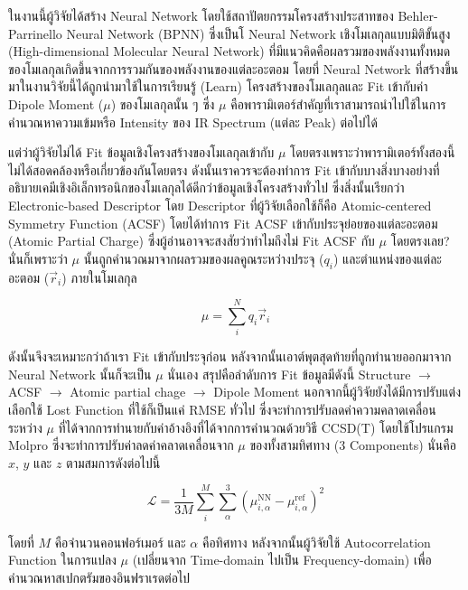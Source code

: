ในงานนี้ผู้วิจัยได้สร้าง Neural Network โดยใช้สถาปัตยกรรมโครงสร้างประสาทของ Behler-Parrinello Neural Network (BPNN)
\autocite{behler2007,behler2011b,behler2015} ซึ่งเป็นโ Neural Network เชิงโมเลกุลแบบมิติขั้นสูง (High-dimensional Molecular 
Neural Network) ที่มีแนวคิดคือผลรวมของพลังงานทั้งหมดของโมเลกุลเกิดขึ้นจากการรวมกันของพลังงานของแต่ละอะตอม โดยที่ Neural Network 
ที่สร้างขึ้นมาในงานวิจัยนี้ได้ถูกนำมาใช้ในการเรียนรู้ (Learn) โครงสร้างของโมเลกุลและ Fit เข้ากับค่า Dipole Moment ($\mu$) ของโมเลกุลนั้น ๆ 
ซึ่ง $\mu$ คือพารามิเตอร์สำคัญที่เราสามารถนำไปใช้ในการคำนวณหาความเข้มหรือ Intensity ของ IR Spectrum (แต่ละ Peak) ต่อไปได้

แต่ว่าผู้วิจัยไม่ได้ Fit ข้อมูลเชิงโครงสร้างของโมเลกุลเข้ากับ $\mu$ โดยตรงเพราะว่าพารามิเตอร์ทั้งสองนี้ไม่ได้สอดคล้องหรือเกี่ยวข้องกันโดยตรง 
ดังนั้นเราควรจะต้องทำการ Fit เข้ากับบางสิ่งบางอย่างที่อธิบายเคมีเชิงอิเล็กทรอนิกของโมเลกุลได้ดีกว่าข้อมูลเชิงโครงสร้างทั่วไป ซึ่งสิ่งนั้นเรียกว่า 
Electronic-based Descriptor โดย Descriptor ที่ผู้วิจัยเลือกใช้ก็คือ Atomic-centered Symmetry Function (ACSF) โดยได้ทำการ 
Fit ACSF เข้ากับประจุย่อยของแต่ละอะตอม (Atomic Partial Charge) ซึ่งผู้อ่านอาจจะสงสัยว่าทำไมถึงไม่ Fit ACSF กับ $\mu$ โดยตรงเลย? 
นั่นก็เพราะว่า $\mu$ นั้นถูกคำนวณมาจากผลรวมของผลคูณระหว่างประจุ ($q_{i}$) และตำแหน่งของแต่ละอะตอม ($\vec{r}_{i}$) ภายในโมเลกุล

\begin{equation}
    \mu = \sum^{N}_{i} q_{i}\vec{r}_{i}
\end{equation}

ดังนั้นจึงจะเหมาะกว่าถ้าเรา Fit เข้ากับประจุก่อน หลังจากนั้นเอาต์พุตสุดท้ายที่ถูกทำนายออกมาจาก Neural Network นั้นก็จะเป็น $\mu$ นั่นเอง 
สรุปคือลำดับการ Fit ข้อมูลมีดังนี้ Structure $\rightarrow$ ACSF $\rightarrow$ Atomic partial chage $\rightarrow$ Dipole 
Moment นอกจากนี้ผู้วิจัยยังได้มีการปรับแต่งเลือกใช้ Lost Function ที่ใช้ก็เป็นแค่ RMSE ทั่วไป ซึ่งจะทำการปรับลดค่าความคลาดเคลื่อนระหว่าง 
$\mu$ ที่ได้จากการทำนายกับค่าอ้างอิงที่ได้จากการคำนวณด้วยวิธี CCSD(T) โดยใช้โปรแกรม Molpro ซึ่งจะทำการปรับค่าลดค่าคลาดเคลื่อนจาก 
$\mu$ ของทั้งสามทิศทาง (3 Components) นั่นคือ $x$, $y$ และ $z$ ตามสมการดังต่อไปนี้

\begin{equation}
    \mathcal{L} = \frac{1}{3M} \sum^{M}_{i} \sum^{3}_{\alpha} (\mu^{\text{NN}}_{i,\alpha} - \mu^{\text{ref}}_{i,\alpha})^{2}
\end{equation}

\noindent โดยที่ $M$ คือจำนวนคอนฟอร์เมอร์ และ $\alpha$ คือทิศทาง หลังจากนั้นผู้วิจัยใช้ Autocorrelation Function ในการแปลง 
$\mu$ (เปลี่ยนจาก Time-domain ไปเป็น Frequency-domain) เพื่อคำนวณหาสเปกตรัมของอินฟราเรดต่อไป 

